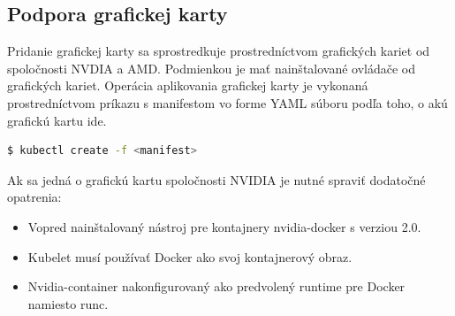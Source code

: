 \subsection{Podpora grafickej karty}

Pridanie grafickej karty sa sprostredkuje prostredníctvom grafických kariet od spoločnosti NVDIA a AMD. Podmienkou je mať nainštalované ovládače od grafických kariet.
Operácia aplikovania grafickej karty je vykonaná prostredníctvom príkazu s manifestom vo forme YAML súboru podľa toho, o akú grafickú kartu ide.

\begin{lstlisting}[language=Bash]
    $ kubectl create -f <manifest>
    \end{lstlisting}

Ak sa jedná o grafickú kartu spoločnosti NVIDIA je nutné spraviť dodatočné opatrenia:

\begin{itemize}
    \item Vopred nainštalovaný nástroj pre kontajnery nvidia-docker s verziou 2.0.
    \item Kubelet musí používať Docker ako svoj kontajnerový obraz.
    \item Nvidia-container nakonfigurovaný ako predvolený runtime pre Docker namiesto runc.
\end{itemize}
